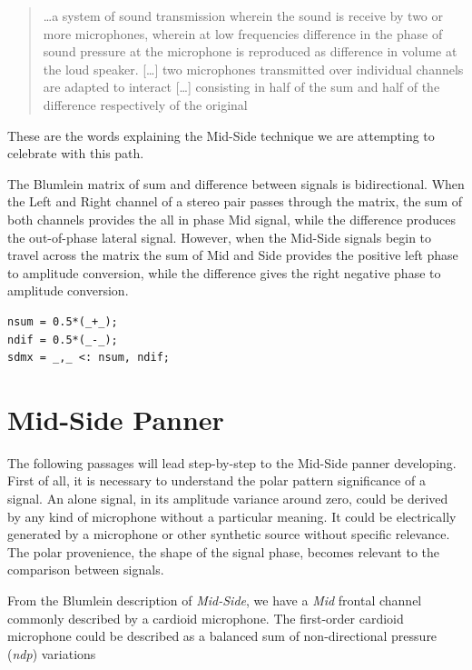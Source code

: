 \documentclass{article}
\begin{document}
\begin{quotation}
\ldots a system of sound transmission wherein the sound
is receive by two or more microphones, wherein at low frequencies difference in
the phase of sound pressure at the microphone is reproduced as difference in
volume at the loud speaker. [\ldots] two microphones transmitted over individual channels are adapted to interact [\ldots] consisting in half of the sum and half of the difference respectively of the original \cite{ab58}
\end{quotation}

These are the words explaining the Mid-Side technique we are attempting to celebrate with this path.  

The Blumlein matrix of sum and difference between signals is bidirectional. When the Left and Right channel of a stereo pair passes through the matrix, the sum of both channels provides the all in phase Mid signal, while the difference produces the out-of-phase lateral signal. However, when the Mid-Side signals begin to travel across the matrix the sum of Mid and Side provides the positive left phase to amplitude conversion, while the difference gives the right negative phase to amplitude conversion. 

\begin{lstlisting}
nsum = 0.5*(_+_);
ndif = 0.5*(_-_);
sdmx = _,_ <: nsum, ndif;
\end{lstlisting}

\section{Mid-Side Panner}
\label{sec:mspanner}

The following passages will lead step-by-step to the Mid-Side panner developing. First of all, it is necessary to understand the polar pattern significance of a signal. An alone signal, in its amplitude variance around zero, could be derived by any kind of microphone without a particular meaning. It could be electrically generated by a microphone or other synthetic source without specific relevance. The polar provenience, the shape of the signal phase, becomes relevant to the comparison between signals.

From the Blumlein description of \emph{Mid-Side}, we have a \emph{Mid} frontal channel commonly described by a cardioid microphone. The first-order cardioid microphone could be described as a balanced sum of non-directional pressure (\emph{ndp}) variations
\end{document}

